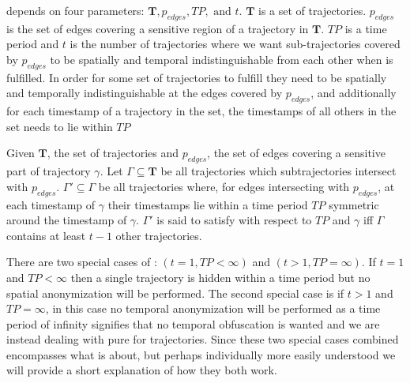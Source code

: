 \tanon depends on four parameters: $\mathbf{T}, p_{edges}, TP,\text{ and } t$. $\mathbf{T}$ is a set of trajectories. $p_{edges}$ is the set of edges covering a sensitive region of a trajectory in $\mathbf{T}$. $TP$ is a time period and $t$ is the number of trajectories where we want sub-trajectories covered by $p_{edges}$ to be spatially and temporal indistinguishable from each other when \tanon is fulfilled. 
In order for some set of trajectories to fulfill \tanon they need to be spatially and temporally indistinguishable at the edges covered by $p_{edges}$, and additionally for each timestamp of a trajectory in the set, the timestamps of all others in the set needs to lie within $TP$


\begin{deff}[\tanonns]
\label{def:tanon}
Given $\mathbf{T}$, the set of trajectories and $p_{edges}$, the set of edges covering a sensitive part of trajectory $\gamma$. 
Let $\Gamma \subseteq \mathbf{T}$ be all trajectories which subtrajectories intersect with $p_{edges}$. $\Gamma' \subseteq \Gamma$ be all trajectories where, for edges intersecting with $p_{edges}$, at each timestamp of $\gamma$ their timestamps lie within a time period $TP$ symmetric around the timestamp of $\gamma$.
$\Gamma'$ is said to satisfy \tanon with respect to $TP$ and $\gamma$ iff $\Gamma$ contains at least $t-1$ other trajectories.
\end{deff}

There are two special cases of \tanonns: $\left(t = 1, TP < \infty \right)$ and $\left(t > 1, TP = \infty\right)$. If $t=1$ and $TP < \infty $ then a single trajectory is hidden within a time period but no spatial anonymization will be performed. The second special case is if $t > 1$ and  $TP = \infty$, in this case no temporal anonymization will be performed as a time period of infinity signifies that no temporal obfuscation is wanted and we are instead dealing with pure \kanon for trajectories. Since these two special cases combined encompasses what \tanon is about, but perhaps individually more easily understood we will provide a short explanation of how they both work.


